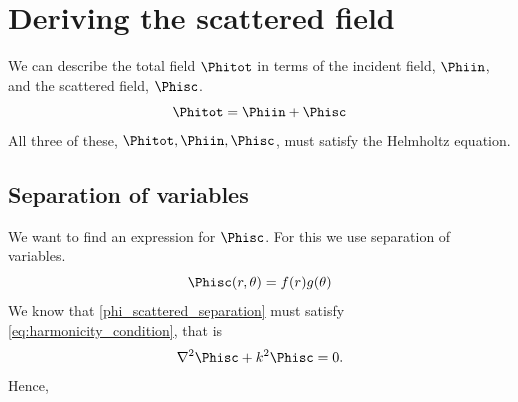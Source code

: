     \section{Deriving the scattered field}
We can describe the total field $\Phitot$ in terms of the incident field, $\Phiin$, and the scattered field, $\Phisc$.
    \begin{equation}
        \Phitot = \Phiin + \Phisc
    \end{equation}
All three of these, $\Phitot, \Phiin, \Phisc$, must satisfy the Helmholtz equation. 

\subsection{Separation of variables}\label{ss:separation_of_vars}
We want to find an expression for $\Phisc$. For this we use separation of variables.
    \begin{equation}\label{phi_scattered_separation}
        \Phisc (r, \theta) = f(r)g(\theta)     
    \end{equation}
We know that \ref{phi_scattered_separation} must satisfy \ref{eq:harmonicity_condition}, that is
    \begin{equation}
        \nabla^2 \Phisc + k^2 \Phisc = 0.
    \end{equation}
Hence,
    
